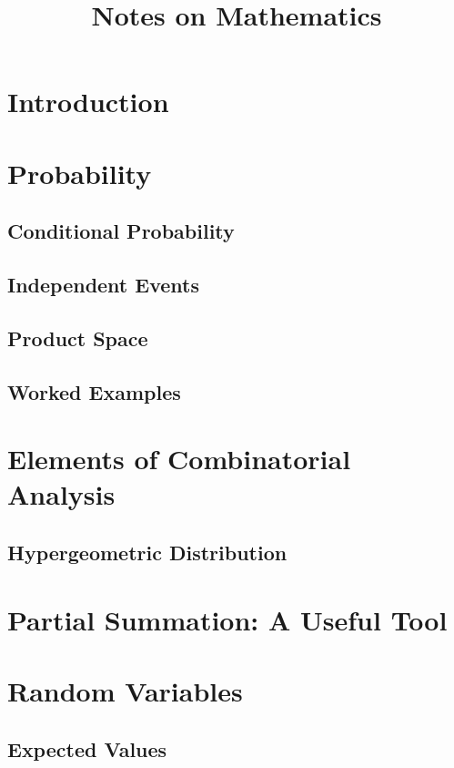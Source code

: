 \documentclass{article}
\title{Notes on Mathematics}
\begin{document}
\maketitle
\tableofcontents

\section{Introduction}


\section{Probability}

\subsection{Conditional Probability}

\subsection{Independent Events}

\subsection{Product Space} 


\subsection{Worked Examples}


\section{Elements of Combinatorial Analysis}

\subsection{Hypergeometric Distribution}

\section[Partial Summation]{Partial Summation: A Useful Tool}


\section{Random Variables}

\subsection{Expected Values}

\end{document}
